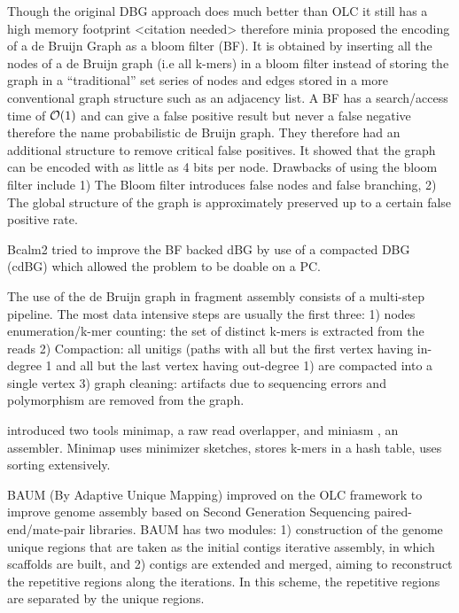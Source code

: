 \documentclass[10pt, a4paper]{article}
\begin{document}
Though the original DBG approach does much better than OLC it still has a high
memory footprint <citation needed> therefore minia
\cite{chikhiSpaceefficientExactBruijn2013} proposed the encoding of a
de Bruijn Graph as a bloom filter (BF). It is obtained by inserting all the
nodes of a de Bruijn graph (i.e all k-mers) in a bloom filter instead of
storing the graph in a “traditional” set series of nodes and edges stored in a
more conventional graph structure such as an adjacency list.
A BF has a search/access time of  \(\mathcal{O}(1)\) and can give a false positive
result but never a false negative therefore the name probabilistic de Bruijn
graph.
They therefore had an additional structure to remove critical false positives.
It showed that the graph can be encoded with as little as 4 bits per node.
Drawbacks of using the bloom filter include 1) The Bloom filter introduces false
nodes and false branching, 2) The global structure of the graph is approximately
preserved up to a certain false positive rate.

Bcalm2 \cite{chikhiCompactingBruijnGraphs2016} tried to improve the BF backed dBG
by use of a compacted DBG (cdBG) which allowed the problem to be doable on a PC.


The use of the de Bruijn graph in fragment assembly consists of a multi-step
pipeline.
The most data intensive steps are usually the first three: 1) nodes
enumeration/k-mer counting: the set of distinct k-mers is extracted from the
reads 2) Compaction: all unitigs (paths with all but the first vertex having
in-degree 1 and all but the last vertex having out-degree 1) are compacted into
a single vertex 3) graph cleaning: artifacts due to sequencing errors and
polymorphism are removed from the graph.

\cite{liMinimapMiniasmFast2016} introduced two tools minimap, a raw read
overlapper, and miniasm \cite{liMinimapMiniasmFast2016}, an assembler.
Minimap uses minimizer sketches, stores k-mers in a hash table, uses sorting
extensively.

BAUM (By Adaptive Unique Mapping) \cite{wangBAUMImprovingGenome2018} improved on
the OLC framework to improve genome assembly based on Second Generation Sequencing
paired-end/mate-pair libraries.
BAUM has two modules: 1) construction of the genome unique regions that are taken
as the initial contigs iterative assembly, in which scaffolds are built, and 2)
contigs are extended and merged, aiming to reconstruct the repetitive regions
along the iterations.
In this scheme, the repetitive regions are separated by the unique regions.
\end{document}
